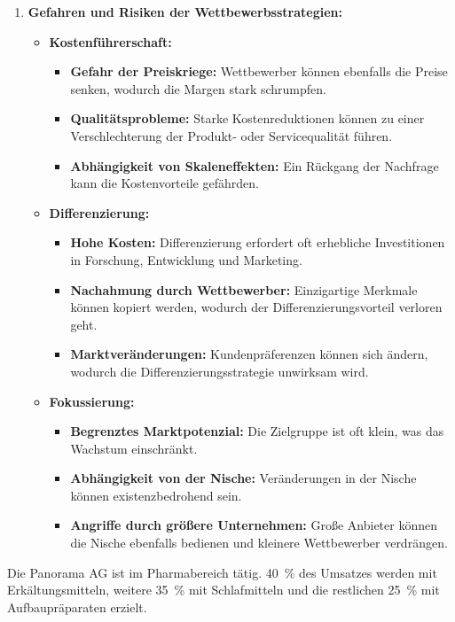 {\begin{enumerate}[label=(\alph*)]
    \item \textbf{Gefahren und Risiken der Wettbewerbsstrategien:}
    \begin{itemize}
        \item \textbf{Kostenführerschaft:}
        \begin{itemize}
            \item \textbf{Gefahr der Preiskriege:} Wettbewerber können ebenfalls die Preise senken, wodurch die Margen stark schrumpfen.
            \item \textbf{Qualitätsprobleme:} Starke Kostenreduktionen können zu einer Verschlechterung der Produkt- oder Servicequalität führen.
            \item \textbf{Abhängigkeit von Skaleneffekten:} Ein Rückgang der Nachfrage kann die Kostenvorteile gefährden.
        \end{itemize}
        \item \textbf{Differenzierung:}
        \begin{itemize}
            \item \textbf{Hohe Kosten:} Differenzierung erfordert oft erhebliche Investitionen in Forschung, Entwicklung und Marketing.
            \item \textbf{Nachahmung durch Wettbewerber:} Einzigartige Merkmale können kopiert werden, wodurch der Differenzierungsvorteil verloren geht.
            \item \textbf{Marktveränderungen:} Kundenpräferenzen können sich ändern, wodurch die Differenzierungsstrategie unwirksam wird.
        \end{itemize}
        \item \textbf{Fokussierung:}
        \begin{itemize}
            \item \textbf{Begrenztes Marktpotenzial:} Die Zielgruppe ist oft klein, was das Wachstum einschränkt.
            \item \textbf{Abhängigkeit von der Nische:} Veränderungen in der Nische können existenzbedrohend sein.
            \item \textbf{Angriffe durch größere Unternehmen:} Große Anbieter können die Nische ebenfalls bedienen und kleinere Wettbewerber verdrängen.
        \end{itemize}
    \end{itemize}
\end{enumerate}
}

Die Panorama AG ist im Pharmabereich tätig. 40~\% des Umsatzes werden mit Erkältungsmitteln, weitere 35~\% mit Schlafmitteln und die restlichen 25~\% mit Aufbaupräparaten erzielt.

